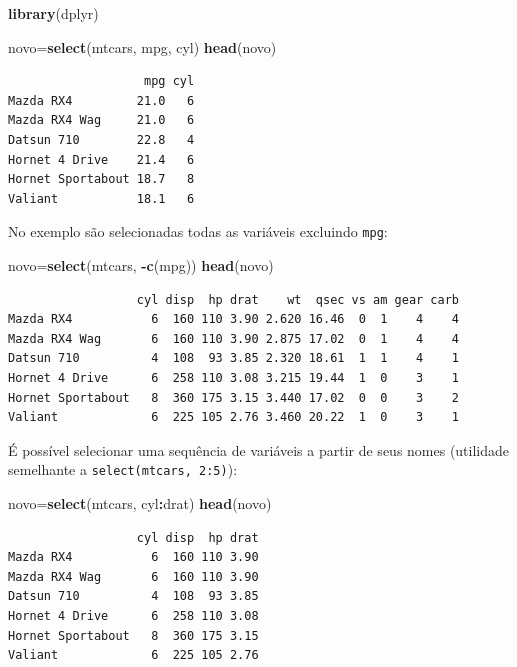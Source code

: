 \documentclass[12pt,brazil,oneside]{book}
\newenvironment{Shaded}{\begin{snugshade}}{\end{snugshade}}
\newcommand{\KeywordTok}[1]{\textcolor[rgb]{0.13,0.29,0.53}{\textbf{#1}}}
\newcommand{\NormalTok}[1]{#1}
\newcommand{\OperatorTok}[1]{\textcolor[rgb]{0.81,0.36,0.00}{\textbf{#1}}}
\begin{document}
\begin{Shaded}
\begin{Highlighting}[]
\KeywordTok{library}\NormalTok{(dplyr)}

\NormalTok{novo=}\KeywordTok{select}\NormalTok{(mtcars, mpg, cyl)}
\KeywordTok{head}\NormalTok{(novo)}
\end{Highlighting}
\end{Shaded}

\begin{verbatim}
                   mpg cyl
Mazda RX4         21.0   6
Mazda RX4 Wag     21.0   6
Datsun 710        22.8   4
Hornet 4 Drive    21.4   6
Hornet Sportabout 18.7   8
Valiant           18.1   6
\end{verbatim}

No exemplo são selecionadas todas as variáveis excluindo \texttt{mpg}:

\begin{Shaded}
\begin{Highlighting}[]
\NormalTok{novo=}\KeywordTok{select}\NormalTok{(mtcars, }\OperatorTok{-}\KeywordTok{c}\NormalTok{(mpg))}
\KeywordTok{head}\NormalTok{(novo)}
\end{Highlighting}
\end{Shaded}

\begin{verbatim}
                  cyl disp  hp drat    wt  qsec vs am gear carb
Mazda RX4           6  160 110 3.90 2.620 16.46  0  1    4    4
Mazda RX4 Wag       6  160 110 3.90 2.875 17.02  0  1    4    4
Datsun 710          4  108  93 3.85 2.320 18.61  1  1    4    1
Hornet 4 Drive      6  258 110 3.08 3.215 19.44  1  0    3    1
Hornet Sportabout   8  360 175 3.15 3.440 17.02  0  0    3    2
Valiant             6  225 105 2.76 3.460 20.22  1  0    3    1
\end{verbatim}

É possível selecionar uma sequência de variáveis a partir de seus nomes (utilidade semelhante a \texttt{select(mtcars,\ 2:5)}):

\begin{Shaded}
\begin{Highlighting}[]
\NormalTok{novo=}\KeywordTok{select}\NormalTok{(mtcars, cyl}\OperatorTok{:}\NormalTok{drat)}
\KeywordTok{head}\NormalTok{(novo)}
\end{Highlighting}
\end{Shaded}

\begin{verbatim}
                  cyl disp  hp drat
Mazda RX4           6  160 110 3.90
Mazda RX4 Wag       6  160 110 3.90
Datsun 710          4  108  93 3.85
Hornet 4 Drive      6  258 110 3.08
Hornet Sportabout   8  360 175 3.15
Valiant             6  225 105 2.76
\end{verbatim}
\end{document}
